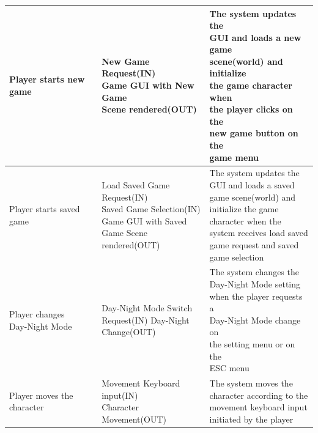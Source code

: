 \documentclass[12pt, titlepage]{article}
\begin{document}
\begin{center}
\begin{longtable}[!bpht]{|m{0.3\linewidth}|m{0.35\linewidth}|m{0.35\linewidth}|}
Player starts new game & \makecell[ml]{New Game Request(IN)\\ Game GUI with New \hspace{-0.5mm}Game\\ Scene rendered(OUT)} & \makecell[ml]{The system updates the\\ GUI and loads a new game\\ scene(world) and initialize\\ the game character when\\ the player clicks on the\\ new game button on the\\ game menu}\\\hline

\makecell[ml]{Player starts saved\\ game} & \makecell[tl]{Load Saved Game\\ Request(IN)\\ Saved Game Selection(IN)\\ Game GUI with Saved\\ \hspace{-0.2mm}Game \hspace{-0.5mm}Scene \hspace{-0.5mm}rendered(OUT)} & The system updates the GUI and loads a saved game scene(world) and initialize the game character when the system receives load saved game request and saved game selection\\\hline

\makecell[ml]{Player changes\\ Day-Night Mode} & \makecell[ml]{Day-Night Mode Switch\\ Request(IN) Day-Night\\ Change(OUT)} & \makecell[ml]{The system changes the\\ Day-Night Mode setting\\ when the player requests a\\ Day-Night Mode change on\\ the setting menu or on the\\ ESC menu}\\\hline

\makecell[ml]{Player moves the\\ character} & \makecell[ml]{Movement Keyboard\\ input(IN)\\ Character \hspace{-0.5mm}Movement(OUT)} & \makecell[ml]{The system moves the\\ character according to the\\ movement keyboard input\\ initiated by the player}\\\hline


\end{longtable}
\end{center}
\end{document}
